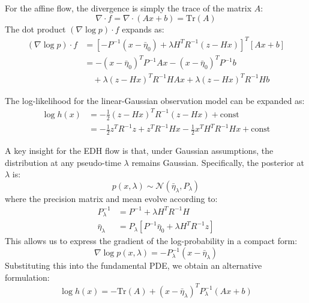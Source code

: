 \documentclass{article}
\begin{document}
For the affine flow, the divergence is simply the trace of the matrix $A$:
\begin{equation}
\nabla \cdot f = \nabla \cdot (Ax + b) = \text{Tr}(A)
\end{equation}
The dot product $(\nabla \log p) \cdot f$ expands as:
\begin{align}
(\nabla \log p) \cdot f &= [-P^{-1}(x-\bar{\eta}_0) + \lambda H^T R^{-1}(z-Hx)]^T [Ax + b] \\
&= -(x-\bar{\eta}_0)^T P^{-1}Ax - (x-\bar{\eta}_0)^T P^{-1}b \\
&\quad + \lambda(z-Hx)^T R^{-1}HAx + \lambda(z-Hx)^T R^{-1}Hb
\end{align}


The log-likelihood for the linear-Gaussian observation model can be expanded as:
\begin{align}
\log h(x) &= -\frac{1}{2}(z-Hx)^T R^{-1}(z-Hx) + \text{const} \\
&= -\frac{1}{2}z^T R^{-1}z + z^T R^{-1}Hx - \frac{1}{2}x^T H^T R^{-1}Hx + \text{const}
\end{align}

A key insight for the EDH flow is that, under Gaussian assumptions, the distribution at any pseudo-time $\lambda$ remains Gaussian. Specifically, the posterior at $\lambda$ is:
\begin{equation}
p(x,\lambda) \sim \mathcal{N}(\bar{\eta}_\lambda, P_\lambda)
\end{equation}
where the precision matrix and mean evolve according to:
\begin{align}
P_\lambda^{-1} &= P^{-1} + \lambda H^T R^{-1}H \\
\bar{\eta}_\lambda &= P_\lambda[P^{-1}\bar{\eta}_0 + \lambda H^T R^{-1}z]
\end{align}
This allows us to express the gradient of the log-probability in a compact form:
\begin{equation}
\nabla \log p(x,\lambda) = -P_\lambda^{-1}(x - \bar{\eta}_\lambda)
\end{equation}
Substituting this into the fundamental PDE, we obtain an alternative formulation:
\begin{equation}
\log h(x) = -\text{Tr}(A) + (x-\bar{\eta}_\lambda)^T P_\lambda^{-1}(Ax + b)
\end{equation}
\end{document}
